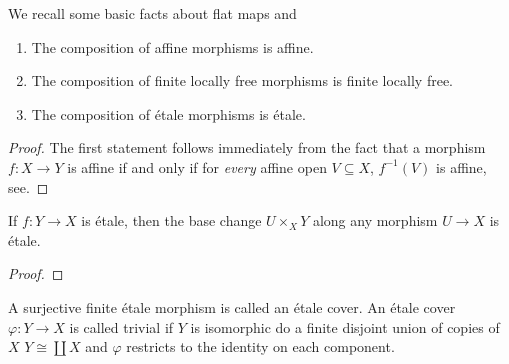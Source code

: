We recall some basic facts about flat maps and 
\begin{lemma}
  \begin{enumerate}
    \item The composition of affine morphisms is affine.
    \item The composition of finite locally free morphisms is finite locally free.
    \item The composition of \'etale morphisms is \'etale.
  \end{enumerate}
\end{lemma}

\begin{proof}
  The first statement follows immediately from the fact that a morphism $f: X \to Y$ is affine if and only if for \textit{every} affine open $V \subseteq X$, $f^{-1}(V)$ is affine, see\cite{Hartshorne}.
\end{proof}

\begin{lemma}
  If $f: Y \to X$ is \'etale, then the base change $U \times_X Y$ along any morphism $U \to X$ is \'etale.
\end{lemma}

\begin{proof}
  
\end{proof}

\begin{definition}
  A surjective finite \'etale morphism is called an \'etale cover. An \'etale cover $\varphi : Y \to X$ is called trivial if $Y$ is isomorphic do a finite disjoint union of copies of $X$ $Y \cong \coprod X$ and $\varphi$ restricts to the identity on each component.
\end{definition}

